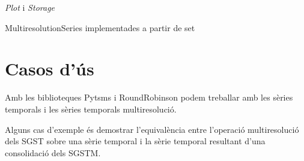 \emph{Plot} i \emph{Storage}


\todo{}
MultiresolutionSeries implementades a partir de set




\section{Casos d'ús}


\todo{}


Amb les biblioteques Pytsms i RoundRobinson podem treballar amb les sèries temporals i les sèries temporals multiresolució. 


Alguns cas d'exemple és demostrar l'equivalència entre l'operació multiresolució dels SGST sobre una sèrie temporal i la sèrie temporal resultant d'una consolidació dels SGSTM. 












